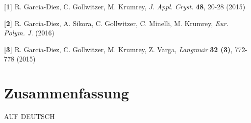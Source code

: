 \bigskip

\footnotesize{

\textbf{[1]} R. Garcia-Diez, C. Gollwitzer, M. Krumrey, \emph{J. Appl. Cryst.} \textbf{48}, 20-28 (2015)

\textbf{[2]} R. Garcia-Diez, A. Sikora, C. Gollwitzer, C. Minelli, M. Krumrey, \emph{Eur. Polym. J.} (2016)

\textbf{[3]} R. Garcia-Diez, C. Gollwitzer, M. Krumrey, Z. Varga, \emph{Langmuir} \textbf{32 (3)}, 772-778 (2015)

}

\normalsize

\cleardoublepage

\thispagestyle{empty}

\section*{Zusammenfassung}

AUF DEUTSCH

\cleardoublepage

